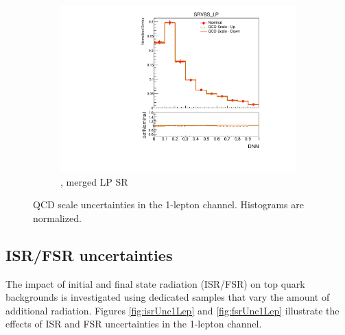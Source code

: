 \begin{figure}[ht]
\begin{subfigure}[b]{0.3\textwidth}
        \includegraphics[width=\textwidth]{figures/1lep/PDFUnc/QCDScale/Z_0ptag1pfat0pjet_0ptv_SRVBS_LP_DNN_SysTheoryQCD_Z__1up_Norm.pdf}
        \caption{\Zjets, merged LP SR}
    \end{subfigure}
    \caption{QCD scale uncertainties in the 1-lepton channel. Histograms are normalized.}
    \label{fig:PDFUnc1Lep_QCD}
\end{figure}

\clearpage
\subsection{ISR/FSR uncertainties}
\label{subsec:isr_fsr_unc}

The impact of initial and final state radiation (ISR/FSR) on top quark backgrounds is investigated using dedicated samples that vary the amount of additional radiation.
Figures \ref{fig:isrUnc1Lep} and \ref{fig:fsrUnc1Lep} illustrate the effects of ISR and FSR uncertainties in the 1-lepton channel.



